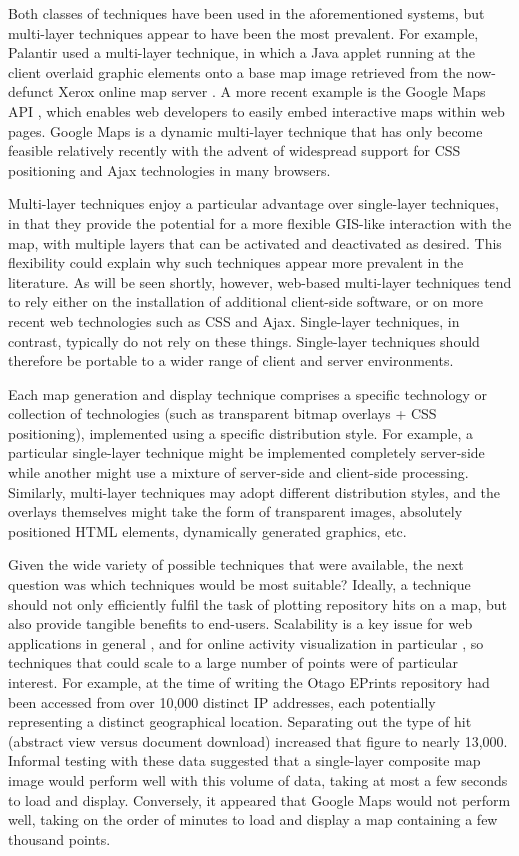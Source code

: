 \documentclass[acmnow]{acmtrans2m}
\begin{document}
Both classes of techniques have been used in the aforementioned systems,
but multi-layer techniques appear to have been the most prevalent. For
example, Palantir used a multi-layer technique, in which a Java applet
running at the client overlaid graphic elements onto a base map image
retrieved from the now-defunct Xerox online map server
\cite{Papa-N-1998-Palantir}. A more recent example is the Google Maps
API \cite{Goog-M-2006-maps}, which enables web developers to easily
embed interactive maps within web pages. Google Maps is a dynamic
multi-layer technique that has only become feasible relatively recently
with the advent of widespread support for CSS positioning and Ajax
technologies in many browsers.

Multi-layer techniques enjoy a particular advantage over single-layer
techniques, in that they provide the potential for a more flexible
GIS-like interaction with the map, with multiple layers that can be
activated and deactivated as desired. This flexibility could explain why
such techniques appear more prevalent in the literature. As will be seen
shortly, however, web-based multi-layer techniques tend to rely either
on the installation of additional client-side software, or on more
recent web technologies such as CSS and Ajax. Single-layer techniques,
in contrast, typically do not rely on these things. Single-layer
techniques should therefore be portable to a wider range of client and
server environments.

Each map generation and display technique comprises a specific
technology or collection of technologies (such as transparent bitmap
overlays + CSS positioning), implemented using a specific distribution
style. For example, a particular single-layer technique might be
implemented completely server-side while another might use a mixture of
server-side and client-side processing. Similarly, multi-layer
techniques may adopt different distribution styles, and the overlays
themselves might take the form of transparent images, absolutely
positioned HTML elements, dynamically generated graphics, etc.

Given the wide variety of possible techniques that were available, the
next question was which techniques would be most suitable? Ideally, a
technique should not only efficiently fulfil the task of plotting
repository hits on a map, but also provide tangible benefits to
end-users. Scalability is a key issue for web applications in general
\cite[p.\ 28]{Offu-J-2002-quality}, and for online activity
visualization in particular \cite[p.\ 50]{Eick-SG-2001-sitevis}, so
techniques that could scale to a large number of points were of
particular interest. For example, at the time of writing the Otago
EPrints repository had been accessed from over 10,000 distinct IP
addresses, each potentially representing a distinct geographical
location. Separating out the type of hit (abstract view versus document
download) increased that figure to nearly 13,000. Informal testing with
these data suggested that a single-layer composite map image would
perform well with this volume of data, taking at most a few seconds to
load and display. Conversely, it appeared that Google Maps would not
perform well, taking on the order of minutes to load and display a map
containing a few thousand points.
\end{document}

